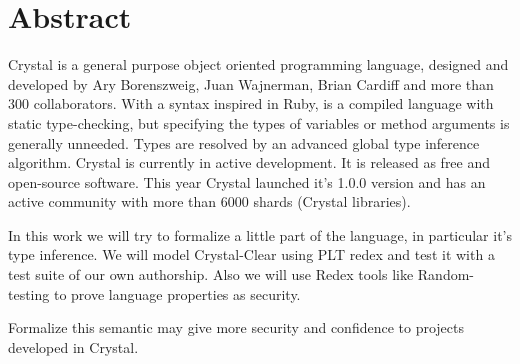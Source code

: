 \setchapterpreamble[u]{\margintoc}
\chapter{Abstract}

Crystal is a general purpose object oriented programming language, designed and developed by Ary Borenszweig, Juan Wajnerman, Brian Cardiff and more than 300 collaborators.
 With a syntax inspired in Ruby, is a compiled language with static type-checking, but specifying the types of variables or method arguments is generally unneeded.
 Types are resolved by an advanced global type inference algorithm.
 Crystal is currently in active development.
 It is released as free and open-source software.
 This year Crystal launched it's 1.0.0 version and has an active community with more than 6000 shards (Crystal libraries).
 
  In this work we will try to formalize a little part of the language, in particular it's type inference.
  We will model Crystal-Clear using PLT redex and test it with a test suite of our own authorship.
  Also we will use Redex tools like Random-testing to prove language properties as security.

  Formalize this semantic may give more security and confidence to projects developed in Crystal.
